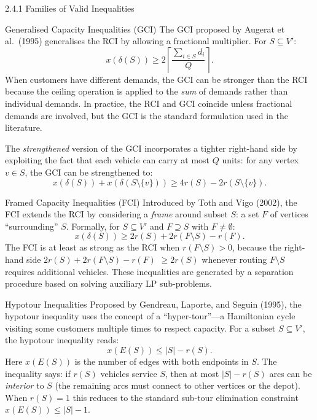 \documentclass[aspectratio=169,10pt]{beamer}
\begin{document}
\begin{frame}[allowframebreaks]{2.4.1 Families of Valid Inequalities}
  \framebreak

  \begin{block}{Generalised Capacity Inequalities (GCI)}
    The GCI proposed by Augerat et al.\ (1995) generalises the RCI by allowing
    a fractional multiplier. For $S \subseteq V'$:
    \[
      x(\delta(S)) \geq 2 \left\lceil \frac{\sum_{i\in S} d_i}{Q} \right\rceil.
    \]
    When customers have different demands, the GCI can be stronger than the
    RCI because the ceiling operation is applied to the \emph{sum} of demands
    rather than individual demands. In practice, the RCI and GCI coincide
    unless fractional demands are involved, but the GCI is the standard
    formulation used in the literature.
  \end{block}

  \bigskip
  The \emph{strengthened} version of the GCI incorporates a tighter right-hand
  side by exploiting the fact that each vehicle can carry at most $Q$ units:
  for any vertex $v \in S$, the GCI can be strengthened to:
  \[
    x(\delta(S)) + x(\delta(S\setminus\{v\})) \geq 4r(S) - 2r(S\setminus\{v\}).
  \]

  \framebreak

  \begin{block}{Framed Capacity Inequalities (FCI)}
    Introduced by Toth and Vigo (2002), the FCI extends the RCI by
    considering a \emph{frame} around subset $S$: a set $F$ of vertices
    ``surrounding'' $S$. Formally, for $S \subseteq V'$ and
    $F \supseteq S$ with $F \neq \emptyset$:
    \[
      x(\delta(S)) \geq 2r(S) + 2r(F\setminus S) - r(F).
    \]
    The FCI is at least as strong as the RCI when $r(F\setminus S) > 0$,
    because the right-hand side $2r(S) + 2r(F\setminus S) - r(F)$
    $\geq 2r(S)$ whenever routing $F\setminus S$ requires additional vehicles.
    These inequalities are generated by a separation procedure based on
    solving auxiliary LP sub-problems.
  \end{block}

  \framebreak

  \begin{block}{Hypotour Inequalities}
    Proposed by Gendreau, Laporte, and Seguin (1995), the hypotour
    inequality uses the concept of a ``hyper-tour''---a Hamiltonian cycle
    visiting some customers multiple times to respect capacity. For a subset
    $S \subseteq V'$, the hypotour inequality reads:
    \[
      x(E(S)) \leq |S| - r(S).
    \]
    Here $x(E(S))$ is the number of edges with both endpoints in $S$. The
    inequality says: if $r(S)$ vehicles service $S$, then at most $|S|-r(S)$
    arcs can be \emph{interior} to $S$ (the remaining arcs must connect to
    other vertices or the depot). When $r(S)=1$ this reduces to the standard
    sub-tour elimination constraint $x(E(S)) \leq |S|-1$.
  \end{block}


\end{frame}
\end{document}
